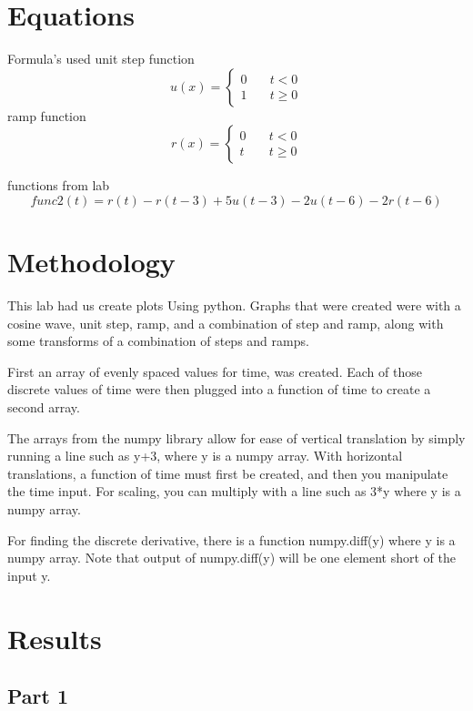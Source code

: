 \documentclass[12pt,a4paper]{article}
\begin{document}
\section{Equations}\label{sec:lit-rev}
Formula's used
unit step function
\[
u(x) = \left\{
        \begin{array}{ll}
            0 & \quad t < 0 \\
            1 & \quad t \geq 0
        \end{array}
    \right.
\]
ramp function
\[
r(x) = \left\{
        \begin{array}{ll}
            0 & \quad t < 0 \\
            t & \quad t \geq 0
        \end{array}
    \right.
\]


functions from lab
\[func2(t) = r(t)-r(t-3)+5u(t-3)-2u(t-6)-2r(t-6)\]


\section{Methodology}\label{sec:meth}
This lab had us create plots Using python.  Graphs that were created were with a cosine wave, unit step, ramp, and a combination of step and ramp, along with some transforms of a combination of steps and ramps.

First an array of evenly spaced values for time, was created. Each of those discrete values of time were then plugged into a function of time to create a second array.

The arrays from the numpy library allow for ease of vertical translation by simply running a line such as
y+3, where y is a numpy array. With horizontal translations, a function of time must first be created, and then you manipulate the time input. For scaling, you can multiply with a line such as 3*y where y is a numpy array.

For finding the discrete derivative, there is a function numpy.diff(y) where y is a numpy array. Note that output of numpy.diff(y) will be one element short of the input y.


\section{Results}\label{sec:res}
\subsection*{Part 1}
\end{document}
